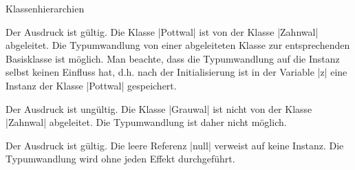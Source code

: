 \begin{exercise}{Klassenhierarchien}
\begin{solution}
\begin{parts}
\item
Der Ausdruck ist gültig. Die Klasse \code|Pottwal| ist von der Klasse \code|Zahnwal| abgeleitet. Die Typumwandlung von einer abgeleiteten Klasse zur entsprechenden Basisklasse ist möglich. Man beachte, dass die Typumwandlung auf die Instanz selbst keinen Einfluss hat, d.h{.} nach der Initialisierung ist in der Variable \code|z| eine Instanz der Klasse \code|Pottwal| gespeichert.

\item
Der Ausdruck ist ungültig. Die Klasse \code|Grauwal| ist nicht von der Klasse \code|Zahnwal| abgeleitet. Die Typumwandlung ist daher nicht möglich.

\item
Der Ausdruck ist gültig. Die leere Referenz \code|null| verweist auf keine Instanz. Die Typumwandlung wird ohne jeden Effekt durchgeführt.
\end{parts}
\end{solution}
\end{exercise}
